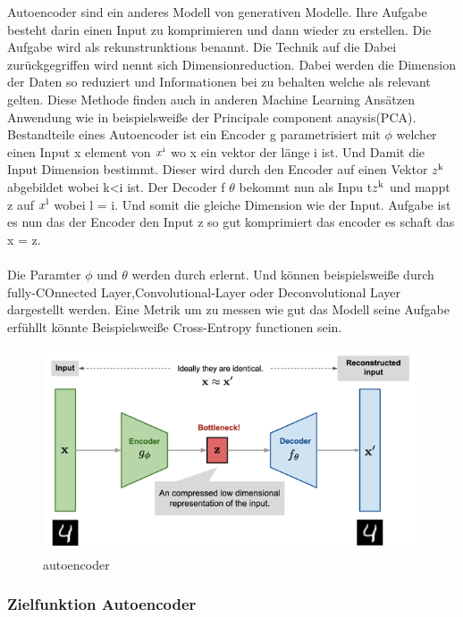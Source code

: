 \documentclass{llncs}
\begin{document}
Autoencoder sind ein anderes Modell von generativen Modelle. Ihre Aufgabe besteht darin einen Input zu komprimieren und dann wieder zu erstellen. Die Aufgabe wird als rekunstrunktions benannt. 
Die Technik auf die Dabei zurückgegriffen wird nennt sich Dimensionreduction. Dabei werden die Dimension der Daten so reduziert und Informationen bei zu behalten welche als relevant gelten. Diese Methode finden auch in anderen Machine Learning Ansätzen Anwendung wie in beispielsweiße der Principale component anaysis(PCA). Bestandteile eines Autoencoder ist ein Encoder g parametrisiert mit $\phi$ welcher einen Input x element von $x\textsuperscript{i}$ wo x ein vektor der länge i ist. Und Damit die Input Dimension bestimmt. Dieser wird durch den Encoder auf einen Vektor $z\textsuperscript{k}$ abgebildet wobei k<i ist. Der Decoder f $\theta$ bekommt nun als Inpu t$z\textsuperscript{k}$ und mappt z auf $x\textsuperscript{l}$ wobei l = i. Und somit die gleiche Dimension wie der Input. Aufgabe ist es nun das der Encoder den Input z so gut komprimiert das encoder es schaft das x = z. 
\\\\
Die Paramter $\phi$ und $\theta$ werden durch erlernt. Und können beispielsweiße durch fully-COnnected Layer,Convolutional-Layer oder Deconvolutional Layer dargestellt werden. Eine Metrik um zu messen wie gut das Modell seine Aufgabe erfühllt könnte Beispielsweiße Cross-Entropy functionen sein.

\begin{figure}[htbp] 
	\centering
	\includegraphics[width=1.0\textwidth]{autoencoder.png}
	\caption{autoencoder}
	\label{fig:Bild1}
\end{figure}

\subsubsection{Zielfunktion Autoencoder\\\\}
\end{document}
